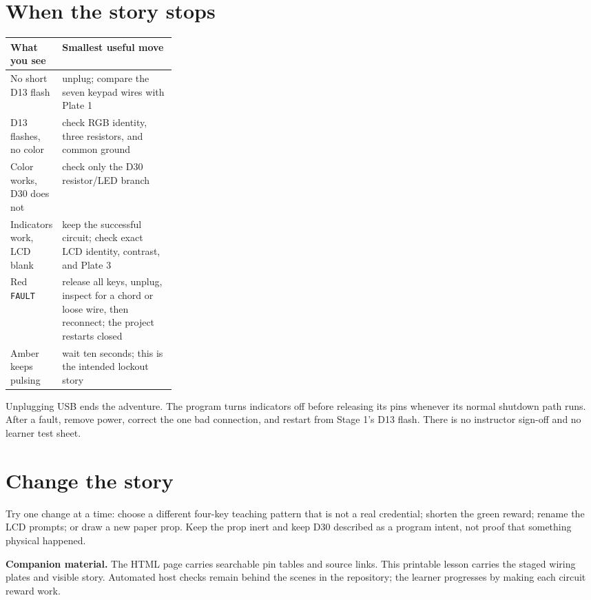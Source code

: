 \documentclass[11pt]{article}
\begin{document}
\section*{When the story stops}

\begin{tabularx}{\linewidth}{@{}p{0.28\linewidth}X@{}}
\toprule
What you see & Smallest useful move\\\midrule
No short D13 flash & unplug; compare the seven keypad wires with Plate 1\\
D13 flashes, no color & check RGB identity, three resistors, and common ground\\
Color works, D30 does not & check only the D30 resistor/LED branch\\
Indicators work, LCD blank & keep the successful circuit; check exact LCD
identity, contrast, and Plate 3\\
Red \texttt{FAULT} & release all keys, unplug, inspect for a chord or loose
wire, then reconnect; the project restarts closed\\
Amber keeps pulsing & wait ten seconds; this is the intended lockout story\\
\bottomrule
\end{tabularx}

Unplugging USB ends the adventure. The program turns indicators off before
releasing its pins whenever its normal shutdown path runs. After a fault,
remove power, correct the one bad connection, and restart from Stage 1's D13
flash. There is no instructor sign-off and no learner test sheet.

\section*{Change the story}

Try one change at a time: choose a different four-key teaching pattern that is
not a real credential; shorten the green reward; rename the LCD prompts; or
draw a new paper prop. Keep the prop inert and keep D30 described as a program
intent, not proof that something physical happened.

\vfill\small
\textbf{Companion material.} The HTML page carries searchable pin tables and
source links. This printable lesson carries the staged wiring plates and
visible story. Automated host checks remain behind the scenes in the
repository; the learner progresses by making each circuit reward work.
\end{document}
